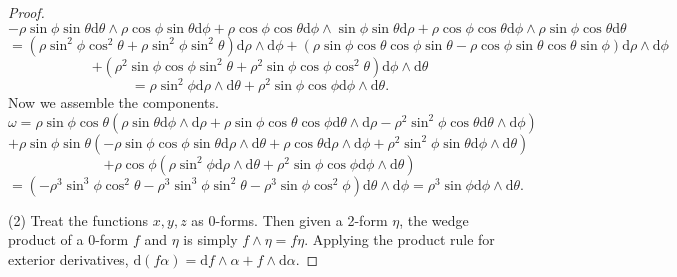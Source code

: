 \documentclass[10pt, letterpaper]{article}
\begin{document}
\begin{proof}
\[	\]
	\[-\rho \sin \phi \sin \theta \mathrm{d} \theta \wedge \rho \cos \phi \sin \theta \mathrm{d} \phi +\rho \cos \phi \cos \theta \mathrm{d} \phi \wedge \sin \phi \sin \theta \mathrm{d} \rho +\rho \cos \phi \cos \theta \mathrm{d} \phi \wedge \rho \sin \phi \cos \theta \mathrm{d} \theta 
	\]
	\[
		=\left( \rho \sin^2 \phi \cos ^2\theta+\rho \sin ^2 \phi \sin ^2\theta   \right) \mathrm{d} \rho \wedge \mathrm{d} \phi +\left( \rho \sin \phi \cos \theta \cos \phi \sin \theta -\rho \cos\phi \sin \theta \cos\theta \sin \phi \right) \mathrm{d} \rho \wedge \mathrm{d} \phi 
	\]
	\[
		+\left( \rho ^2 \sin \phi \cos \phi \sin ^2\theta +\rho ^2 \sin \phi \cos \phi \cos ^2\theta  \right) \mathrm{d} \phi \wedge \mathrm{d} \theta 
	\]
	\[
		=\rho \sin ^2\phi \mathrm{d} \rho \wedge \mathrm{d}\theta   +\rho ^2 \sin \phi \cos \phi \mathrm{d} \phi \wedge \mathrm{d} \theta 
	.\]
	Now we assemble the components.
	\[
		\omega =\rho \sin \phi \cos \theta \left( \rho \sin \theta \mathrm{d} \phi \wedge \mathrm{d} \rho +\rho \sin \phi \cos \theta \cos \phi \mathrm{d} \theta \wedge \mathrm{d}\rho  -\rho ^2 \sin ^2\phi \cos \theta \mathrm{d} \theta \wedge \mathrm{d} \phi  \right) 
	\]
	\[
		+\rho \sin \phi \sin \theta \left( -\rho \sin \phi \cos \phi \sin \theta \mathrm{d} \rho \wedge \mathrm{d} \theta +\rho \cos \theta \mathrm{d} \rho \wedge \mathrm{d} \phi +\rho ^2 \sin ^2\phi \sin \theta \mathrm{d} \phi \wedge \mathrm{d} \theta  \right) 
	\]
	\[
		+\rho \cos \phi \left( \rho \sin ^2\phi \mathrm{d} \rho \wedge \mathrm{d} \theta +\rho ^2 \sin \phi \cos \phi \mathrm{d} \phi \wedge \mathrm{d} \theta  \right) 
	\]
	\[
		=\left(-\rho ^3 \sin ^3\phi \cos ^2\theta -\rho ^3 \sin ^3\phi \sin ^2\theta -\rho ^3 \sin \phi \cos ^2\phi \right)\mathrm{d} \theta \wedge \mathrm{d} \phi =\boxed{\rho ^3 \sin \phi \mathrm{d} \phi \wedge \mathrm{d} \theta }
	.\]
	
	(2) Treat the functions $x,y,z$ as 0-forms. Then given a 2-form $\eta $, the wedge product of a 0-form $f$ and $\eta $ is simply $f \wedge \eta =f\eta $. Applying the product rule for exterior derivatives, $\mathrm{d} (f\alpha )=\mathrm{d} f\wedge \alpha +f\wedge \mathrm{d} \alpha $.


\end{proof}
\end{document}
